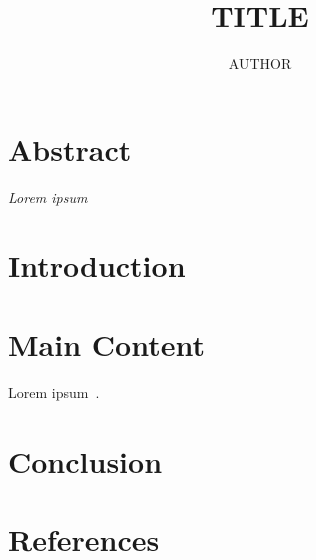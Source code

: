 \documentclass[10pt,twocolumn,letterpaper]{article}
\title{{\fontseries{bx}\selectfont \fontsize{14}{17}\selectfont TITLE}}
\author{AUTHOR}
\date{}
\begin{document}
\pagestyle{empty}
\maketitle
\thispagestyle{empty}

\section*{\centering Abstract}%
  \textit{%
  Lorem ipsum
}
\vspace*{1\baselineskip} %


\section{Introduction}

\section{Main Content}
Lorem ipsum~\citep{greenwade93}.

\section{Conclusion}

\section{References}
\printbibliography[heading=none]
\end{document}
